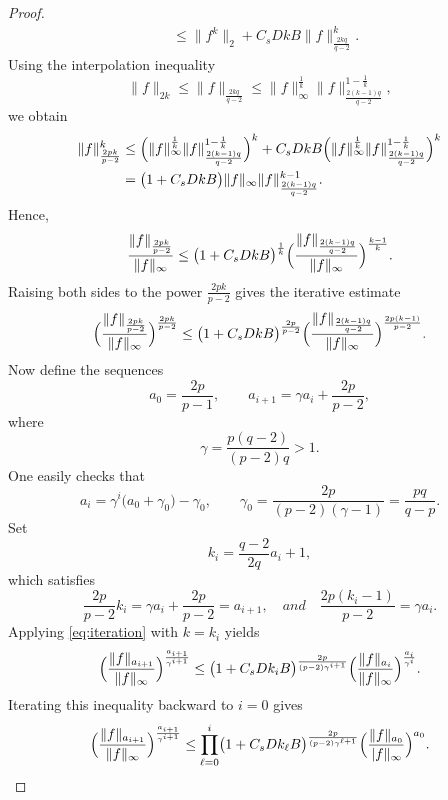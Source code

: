 \documentclass[10pt,a4paper]{amsart}
\begin{document}
\begin{proof}
{\begin{align*}
		&\le \|f^k\|_2 + C_s D k B \|f\|_{\frac{2kq}{q-2}}^k .
		\end{align*}
		Using the interpolation inequality
		\[
	\|f\|_{2k}\le	\|f\|_{\frac{2kq}{q-2}} \le \|f\|_\infty^{\frac{1}{k}} \|f\|_{\frac{2(k-1)q}{q-2}}^{1-\frac{1}{k}},
		\]
		we obtain
		\begin{align*}
		\|f\|_{\frac{2pk}{p-2}}^k 
		&\le \Bigl(\|f\|_\infty^{\frac{1}{k}} \|f\|_{\frac{2(k-1)q}{q-2}}^{1-\frac{1}{k}}\Bigr)^k
		+ C_s D k B \Bigl(\|f\|_\infty^{\frac{1}{k}} \|f\|_{\frac{2(k-1)q}{q-2}}^{1-\frac{1}{k}}\Bigr)^k \\
		&= \bigl(1 + C_s D k B\bigr)
		\|f\|_\infty \|f\|_{\frac{2(k-1)q}{q-2}}^{k-1}.
		\end{align*}    
		Hence,
		\[
		\frac{\|f\|_{\frac{2pk}{p-2}}}{\|f\|_\infty}
		\le \bigl(1 + C_s D k B\bigr)^{\frac{1}{k}}
		\Bigl(\frac{\|f\|_{\frac{2(k-1)q}{q-2}}}{\|f\|_\infty}\Bigr)^{\frac{k-1}{k}} .
		\]    
		Raising both sides to the power \(\frac{2pk}{p-2}\) gives the iterative estimate
		\begin{equation}\label{eq:iteration}
		\Bigl(\frac{\|f\|_{\frac{2pk}{p-2}}}{\|f\|_\infty}\Bigr)^{\frac{2pk}{p-2}}
		\le \bigl(1 + C_s D k B\bigr)^{\frac{2p}{p-2}}
		\Bigl(\frac{\|f\|_{\frac{2(k-1)q}{q-2}}}{\|f\|_\infty}\Bigr)^{\frac{2p(k-1)}{p-2}} .
		\end{equation}    
		Now define the sequences
		\[
		a_0 = \frac{2p}{p-1}, \qquad
		a_{i+1} = \gamma a_i + \frac{2p}{p-2},
		\]
		where 
		\begin{equation*}
			\gamma = \frac{p(q-2)}{(p-2)q} > 1.
		\end{equation*}
		One easily checks that
		\[
		a_i = \gamma^i\bigl(a_0 + \gamma_0\bigr) - \gamma_0, \qquad
		\gamma_0 = \frac{2p}{(p-2)(\gamma-1)} =\frac{pq}{q-p}.
		\]
		Set
		\[
		k_i = \frac{q-2}{2q}a_i + 1,
		\]
		which satisfies
		\[
		\frac{2p}{p-2}k_i = \gamma a_i + \frac{2p}{p-2} = a_{i+1},\quad and\quad \frac{2p(k_{i}-1)}{p-2}=\gamma a_{i}.
		\]
		Applying \eqref{eq:iteration} with \(k = k_i\) yields
		\[
		\Bigl(\frac{\|f\|_{a_{i+1}}}{\|f\|_\infty}\Bigr)^{\frac{a_{i+1}}{\gamma^{i+1}}}
		\le \bigl(1 + C_s D k_i B\bigr)^{\frac{2p}{(p-2)\gamma^{i+1}}}
		\Bigl(\frac{\|f\|_{a_i}}{\|f\|_\infty}\Bigr)^{\frac{a_i}{\gamma^i}} .
		\]
		Iterating this inequality backward to \(i=0\) gives
		\[
		\Bigl(\frac{\|f\|_{a_{i+1}}}{\|f\|_\infty}\Bigr)^{\frac{a_{i+1}}{\gamma^{i+1}}}
		\le \prod_{\ell=0}^{i} \bigl(1 + C_s D k_\ell B\bigr)^{\frac{2p}{(p-2)\gamma^{\ell+1}}}
		\Bigl(\frac{\|f\|_{a_0}}{\\|f\|_\infty}\Bigr)^{a_0}.
\]}
\end{proof}
\end{document}
